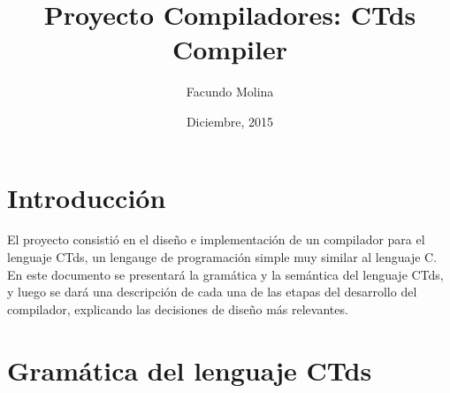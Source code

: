 \documentclass[11pt,a4paper]{article}
\author{Facundo Molina}
\begin{document}
\title{Proyecto Compiladores: CTds Compiler}
\date{Diciembre, 2015}
\maketitle

\section{Introducción}
\label{sec:intro}
El proyecto consistió en el diseño e implementación de un compilador para el lenguaje CTds, un lengauge de programación simple muy similar al lenguaje C.  En este documento se presentará la gramática y la semántica del lenguaje CTds, y luego se dará una descripción de cada una de las etapas del desarrollo del compilador, explicando las decisiones de diseño más relevantes.

\section{Gramática del lenguaje CTds}
\label{sec:gramatica}
\end{document}
